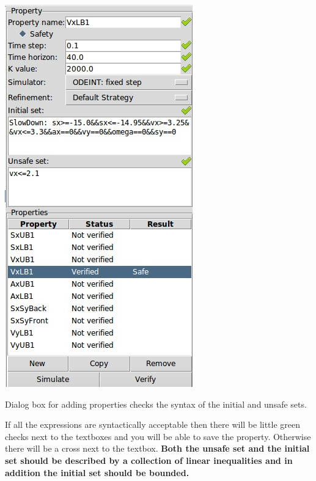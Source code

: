 \documentclass{tufte-book} %
\begin{document}
\begin{marginfigure}
\centerline{\includegraphics[width=\textwidth]{Figures/property_dialog.png}}
 \caption{Dialog box for adding properties checks the syntax of the initial and unsafe sets.}
 \label{fig:property dialog}
\end{marginfigure}
%
If all the expressions are syntactically acceptable then there will be little green checks
next to the textboxes and you will be able to save the property. Otherwise there will be a cross next to the textbox.
{\bf Both the unsafe set and the initial set should be described by a collection of linear inequalities and in addition the initial set should be bounded.\/}
\end{document}
